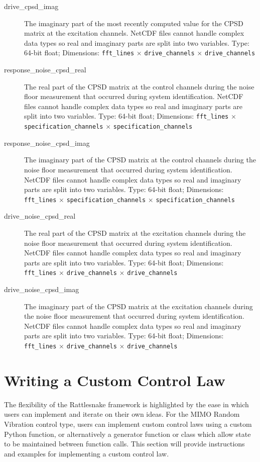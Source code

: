 \documentclass[pdf,12pt,report]{SANDreport}
\newcommand{\inlineCode}{\lstinline[basicstyle=\bfseries\ttfamily]}
\begin{document}
\begin{description}
        \item[drive\_cpsd\_imag] The imaginary part of the most recently computed value for the \ac{CPSD} matrix at the excitation channels.  NetCDF files cannot handle complex data types so real and imaginary parts are split into two variables.  Type: 64-bit float; Dimensions: \inlineCode{fft_lines} $\times$ \inlineCode{drive_channels} $\times$ \inlineCode{drive_channels}
        
        \item[response\_noise\_cpsd\_real] The real part of the \ac{CPSD} matrix at the control channels during the noise floor measurement that occurred during system identification.  NetCDF files cannot handle complex data types so real and imaginary parts are split into two variables.  Type: 64-bit float; Dimensions: \inlineCode{fft_lines} $\times$ \inlineCode{specification_channels} $\times$ \inlineCode{specification_channels}
        
        \item[response\_noise\_cpsd\_imag] The imaginary part of the \ac{CPSD} matrix at the control channels during the noise floor measurement that occurred during system identification.  NetCDF files cannot handle complex data types so real and imaginary parts are split into two variables.  Type: 64-bit float; Dimensions: \inlineCode{fft_lines} $\times$ \inlineCode{specification_channels} $\times$ \inlineCode{specification_channels}
        
        \item[drive\_noise\_cpsd\_real] The real part of the \ac{CPSD} matrix at the excitation channels during the noise floor measurement that occurred during system identification.  NetCDF files cannot handle complex data types so real and imaginary parts are split into two variables.  Type: 64-bit float; Dimensions: \inlineCode{fft_lines} $\times$ \inlineCode{drive_channels} $\times$ \inlineCode{drive_channels}
        
        \item[drive\_noise\_cpsd\_imag] The imaginary part of the \ac{CPSD} matrix at the excitation channels during the noise floor measurement that occurred during system identification.  NetCDF files cannot handle complex data types so real and imaginary parts are split into two variables.  Type: 64-bit float; Dimensions: \inlineCode{fft_lines} $\times$ \inlineCode{drive_channels} $\times$ \inlineCode{drive_channels}
    \end{description}
    
    \section{Writing a Custom Control Law}\label{sec:rattlesnake_environments_custom_control_law}
    The flexibility of the Rattlesnake framework is highlighted by the ease in which users can implement and iterate on their own ideas.  For the \Ac{MIMO} Random Vibration control type, users can implement custom control laws using a custom Python function, or alternatively a generator function or class which allow state to be maintained between function calls.  This section will provide instructions and examples for implementing a custom control law.
    
\end{document}
